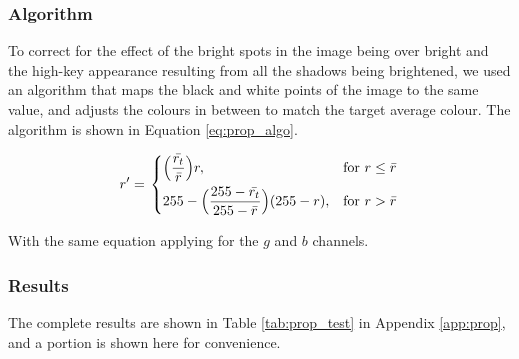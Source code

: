\subsubsection*{Algorithm}
To correct for the effect of the bright spots in the image being over bright and the high-key appearance resulting from all the shadows being brightened, we used an algorithm that maps the black and white points of the image to the same value, and adjusts the colours in between to match the target average colour. The algorithm is shown in Equation \ref{eq:prop_algo}.

\begin{equation} \label{eq:prop_algo}
  r' = \left.
  \begin{dcases}
    \displaystyle \Big(\frac{\bar{r_t}}{\bar{r}}\Big)r, & \text{for } r \leq \bar{r} \\
    \displaystyle 255 - 
    \Big(\frac{255 - \bar{r_t}}{255 - \bar{r}}\Big)(255 - r), & \text{for } r > \bar{r} \\
  \end{dcases}
  \right.
\end{equation}



With the same equation applying for the $g$ and $b$ channels.

\subsubsection*{Results}
The complete results are shown in Table \ref{tab:prop_test} in Appendix \ref{app:prop}, and a portion is shown here for convenience.



